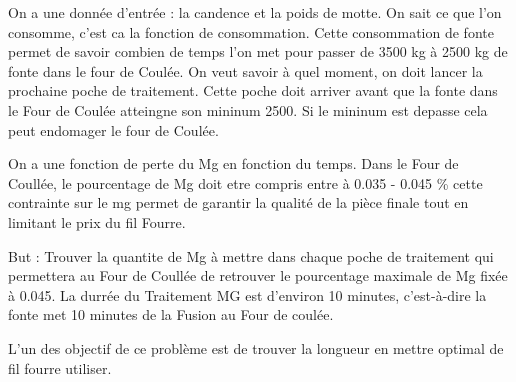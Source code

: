 \documentclass[12pt]{article}
\begin{document}
On a une donnée d'entrée : la candence et la poids de motte. On sait ce que 
l'on consomme, c'est ca la fonction de consommation. Cette consommation de 
fonte permet de savoir combien de temps l'on met pour passer de 3500 kg à 
2500 kg de fonte dans le four de Coulée. On veut savoir à quel moment, on 
doit lancer la prochaine poche de traitement. Cette poche doit arriver avant
que la fonte dans le Four de Coulée atteingne son mininum 2500. Si le 
mininum est depasse cela peut endomager le four de Coulée.



On a une fonction de perte du Mg en fonction du temps.
Dans le Four de Coullée, le pourcentage de Mg doit etre compris entre à 
0.035 - 0.045 \% cette contrainte sur le mg permet de garantir la qualité 
de la pièce finale tout en limitant le prix du fil Fourre.


But : Trouver la quantite de Mg à mettre dans chaque poche de traitement
qui permettera au Four de Coullée de retrouver le pourcentage maximale de Mg
fixée à 0.045. La durrée du Traitement MG est d'environ 10 minutes, 
c'est-à-dire la fonte met 10 minutes de la Fusion au Four de coulée.



L'un des objectif de ce problème 
est de trouver la longueur en mettre optimal de fil fourre utiliser. 

\end{document}

